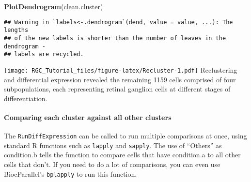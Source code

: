 \documentclass[]{article}
\newenvironment{Shaded}{\begin{snugshade}}{\end{snugshade}}
\newcommand{\KeywordTok}[1]{\textcolor[rgb]{0.13,0.29,0.53}{\textbf{#1}}}
\newcommand{\NormalTok}[1]{#1}
\let\oldparagraph\paragraph
\renewcommand{\paragraph}[1]{\oldparagraph{#1}\mbox{}}
\begin{document}
\begin{Shaded}
\begin{Highlighting}[]
\KeywordTok{PlotDendrogram}\NormalTok{(clean.cluster)}
\end{Highlighting}
\end{Shaded}

\begin{verbatim}
## Warning in `labels<-.dendrogram`(dend, value = value, ...): The lengths
## of the new labels is shorter than the number of leaves in the dendrogram -
## labels are recycled.
\end{verbatim}

\texttt{[image: RGC\_Tutorial\_files/figure-latex/Recluster-1.pdf]}
Reclustering and differential expression revealed the remaining 1159
cells comprised of four subpopulations, each representing retinal
ganglion cells at different stages of differentiation.

\hypertarget{comparing-each-cluster-against-all-other-clusters}{%
\paragraph{Comparing each cluster against all other
clusters}\label{comparing-each-cluster-against-all-other-clusters}}

The \texttt{RunDiffExpression} can be called to run multiple comparisons
at once, using standard R functions such as \texttt{lapply} and
\texttt{sapply}. The use of ``Others'' as condition.b tells the function
to compare cells that have condition.a to all other cells that don't. If
you need to do a lot of comparisons, you can even use BiocParallel's
\texttt{bplapply} to run this function.
\end{document}

